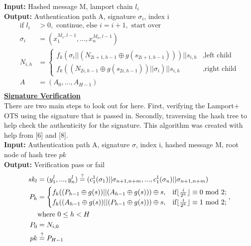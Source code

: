 \documentclass[]{scrartcl}
\DeclarePairedDelimiter\floor{\lfloor}{\rfloor}
\begin{document}
\textbf{Input:} Hashed message M, lamport chain $l_i$\\
\textbf{Output:} Authentication path A, signature $\sigma_i$, index i
\begin{equation}
\begin{split}
\textrm{if }l_i & > 0, \textrm{ continue, else } i = i+1,\textrm{ start over}\\
\sigma_i & = (x^{M_1,l-1}_1, ..., x^{M_n,l-1}_n)\\
N_{i,h} & = 
\begin{cases}
f_k(\sigma_i||(N_{2i+1,h-1} \oplus g(s_{2i+1,h-1})))||s_{i,h} & ,\textrm{left child} \\
f_k((N_{2i,h-1} \oplus g(s_{2i,h-1}))||\sigma_i)||s_{i,h} & ,\textrm{right child}
\end{cases}
\\A & = (A_0,...,A_{H-1})\\
\end{split}
\end{equation}
\textbf{\underline{Signature Verification}}\\
There are two main steps to look out for here. First, verifying the Lamport+ OTS using the signature that is passed in. Secondly, traversing the hash tree to help check the authenticity for the signature. This algorithm was created with help from [6] and [8].\\
\textbf{Input:} Authentication path A, signature $\sigma$, index i, hashed message M, root node of hash tree $pk$\\
\textbf{Output:} Verification pass or fail\\
\begin{equation}
\begin{split}
sk_l & = (y^l_1,...,y^l_n) \stackrel{?}{=}(c^1_1(\sigma_{1})||\sigma_{n+1,n+m},...,c^1_1(\sigma_{n})||\sigma_{n+1,n+m})\\
P_h & =
\begin{cases}
f_k((P_{h-1} \oplus g(s))||(A_{h-1} \oplus g(s))) \oplus s, & \textrm{if}\floor{\frac{i}{2^h}} \equiv 0 \textrm{ mod }2;\\
f_k((A_{h-1} \oplus g(s))||(P_{h-1} \oplus g(s))) \oplus s, & \textrm{if}\floor{\frac{i}{2^h}} \equiv 1 \textrm{ mod }2;
\end{cases}
,\\ & \textrm{where }0 \leq h < H\\
P_0 & = N_{i,0}\\
pk & \stackrel{?}{=} P_{H-1}
\end{split}
\end{equation}
\end{document}
